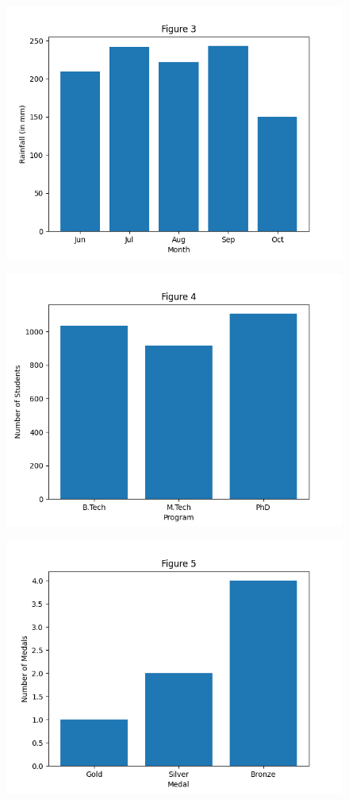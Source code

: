 \documentclass[journal,12pt,twocolumn]{IEEEtran}
\begin{document}
	\begin{figure}[!ht]
		\centering
		\includegraphics[width=\columnwidth]{figs/fig-3.png}
		\label{fig3}
	\end{figure}
	
	\begin{figure}[!ht]
		\centering
		\includegraphics[width=\columnwidth]{figs/fig-4.png}
		\label{fig4}
	\end{figure}
	
	\begin{figure}[!ht]
		\centering
		\includegraphics[width=\columnwidth]{figs/fig-5.png}
		\label{fig5}
	\end{figure}
	
\end{document}

